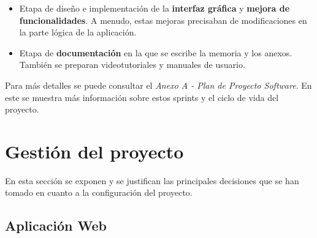 \begin{itemize}
\begin{itemize}
			\item Configurar badges \footnote{Distintivos que aportan información rápida sobre el estado del proyecto en ciertos aspectos como la cobertura, la calidad de código o el proceso de CI/CD y enlazan con la fuente de información} para representar el estado del proyecto en cuanto a calidad de código, cobertura, despliegue y los trabajos de CI/CD.
		\end{itemize}
	\item Etapa  de diseño e implementación de la \textbf{interfaz gráfica} y \textbf{mejora de funcionalidades}. A menudo, estas mejoras precisaban de modificaciones en la parte lógica de la aplicación.
	\item Etapa de \textbf{documentación} en la que se escribe la memoria y los anexos. También se preparan videotutoriales y manuales de usuario.
\end{itemize}

Para más detalles se puede consultar el \textit{Anexo A - Plan de Proyecto Software}. En este se muestra más información sobre estos sprints y el ciclo de vida del proyecto.

\section{Gestión del proyecto}

En esta sección se exponen y se justifican las principales decisiones que se han tomado en cuanto a la configuración del proyecto.

\subsection{Aplicación Web}

